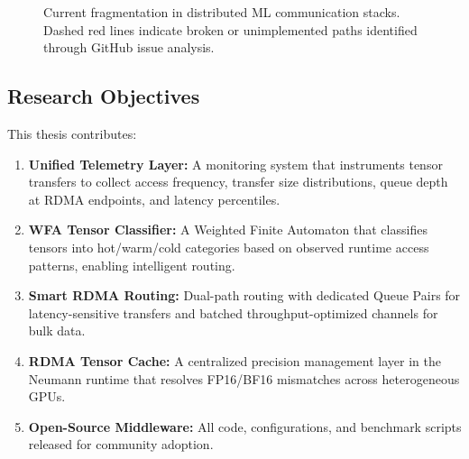 \documentclass[11pt,letterpaper]{article}
\theoremstyle{definition}
\begin{document}
\begin{figure}[htbp]
{%
}
\caption{Current fragmentation in distributed ML communication stacks. Dashed red lines indicate broken or unimplemented paths identified through GitHub issue analysis.}
\label{fig:fragmentation-overview}
\end{figure}

\subsection{Research Objectives}

This thesis contributes:

\begin{enumerate}[label=\textbf{C\arabic*.}]
    \item \textbf{Unified Telemetry Layer:} A monitoring system that instruments tensor transfers to collect access frequency, transfer size distributions, queue depth at RDMA endpoints, and latency percentiles.
    \item \textbf{WFA Tensor Classifier:} A Weighted Finite Automaton that classifies tensors into hot/warm/cold categories based on observed runtime access patterns, enabling intelligent routing.
    \item \textbf{Smart RDMA Routing:} Dual-path routing with dedicated Queue Pairs for latency-sensitive transfers and batched throughput-optimized channels for bulk data.
    \item \textbf{RDMA Tensor Cache:} A centralized precision management layer in the Neumann runtime that resolves FP16/BF16 mismatches across heterogeneous GPUs.
    \item \textbf{Open-Source Middleware:} All code, configurations, and benchmark scripts released for community adoption.
\end{enumerate}
\end{document}
